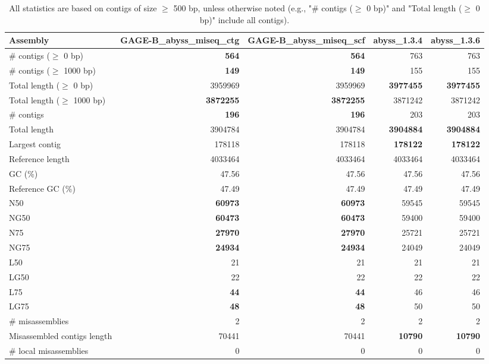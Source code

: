 \documentclass[12pt,a4paper]{article}
\begin{document}
\begin{table}[ht]
\begin{center}
\caption{All statistics are based on contigs of size $\geq$ 500 bp, unless otherwise noted (e.g., "\# contigs ($\geq$ 0 bp)" and "Total length ($\geq$ 0 bp)" include all contigs).}
\begin{tabular}{|l*{4}{|r}|}
\hline
Assembly & GAGE-B\_abyss\_miseq\_ctg & GAGE-B\_abyss\_miseq\_scf & abyss\_1.3.4 & abyss\_1.3.6 \\ \hline
\# contigs ($\geq$ 0 bp) & {\bf 564} & {\bf 564} & 763 & 763 \\ \hline
\# contigs ($\geq$ 1000 bp) & {\bf 149} & {\bf 149} & 155 & 155 \\ \hline
Total length ($\geq$ 0 bp) & 3959969 & 3959969 & {\bf 3977455} & {\bf 3977455} \\ \hline
Total length ($\geq$ 1000 bp) & {\bf 3872255} & {\bf 3872255} & 3871242 & 3871242 \\ \hline
\# contigs & {\bf 196} & {\bf 196} & 203 & 203 \\ \hline
Total length & 3904784 & 3904784 & {\bf 3904884} & {\bf 3904884} \\ \hline
Largest contig & 178118 & 178118 & {\bf 178122} & {\bf 178122} \\ \hline
Reference length & 4033464 & 4033464 & 4033464 & 4033464 \\ \hline
GC (\%) & 47.56 & 47.56 & 47.56 & 47.56 \\ \hline
Reference GC (\%) & 47.49 & 47.49 & 47.49 & 47.49 \\ \hline
N50 & {\bf 60973} & {\bf 60973} & 59545 & 59545 \\ \hline
NG50 & {\bf 60473} & {\bf 60473} & 59400 & 59400 \\ \hline
N75 & {\bf 27970} & {\bf 27970} & 25721 & 25721 \\ \hline
NG75 & {\bf 24934} & {\bf 24934} & 24049 & 24049 \\ \hline
L50 & 21 & 21 & 21 & 21 \\ \hline
LG50 & 22 & 22 & 22 & 22 \\ \hline
L75 & {\bf 44} & {\bf 44} & 46 & 46 \\ \hline
LG75 & {\bf 48} & {\bf 48} & 50 & 50 \\ \hline
\# misassemblies & 2 & 2 & 2 & 2 \\ \hline
Misassembled contigs length & 70441 & 70441 & {\bf 10790} & {\bf 10790} \\ \hline
\# local misassemblies & 0 & 0 & 0 & 0 \\ \hline

\end{tabular}
\end{center}
\end{table}
\end{document}
